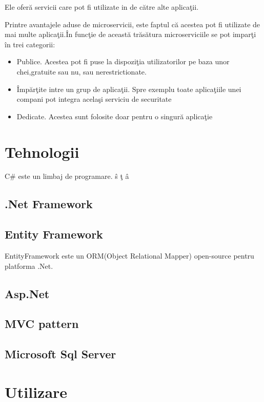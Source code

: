 \documentclass[a4paper,12pt]{report}
\begin{document}
 Ele ofer\u a servicii care pot fi utilizate in de c\u atre alte aplica\c tii.
\iffalse Utilizarea unui microserviciu se
 poate asem\u ana cu o clas\u a, apelarea metodelor fiind similara cu trimiterea unei
 cereri c\u atre server.Probabil cea mai mare deosebire intre acestea const\u a in faptul
 c\u a Microserviciile sunt  
\fi
Printre avantajele aduse de microservicii, este faptul c\u a acestea pot fi utilizate de
mai multe aplica\c tii.\^In func\c tie de aceast\u a tr\u as\u atura microserviciile se pot impar\c ti \^in 
trei categorii:
\begin{itemize}
    \item Publice.
    Acestea pot fi puse la dispozi\c tia utilizatorilor pe baza unor chei,gratuite sau nu,
    sau nerestrictionate.
    \item \^Imp\u ar\c tite intre un grup de aplica\c tii.
    Spre exemplu toate aplica\c tiile unei compani pot integra acela\c si serviciu de securitate
    \item Dedicate.
    Acestea sunt folosite doar pentru o singur\u a aplica\c tie 
\end{itemize} 




\chapter{Tehnologii}

    C\# este un limbaj de programare. \^ s \c t \^a

    \section{.Net Framework}
    \section{Entity Framework}
        EntityFramework este un ORM(Object Relational Mapper) open-source pentru platforma .Net.
    \section{Asp.Net}
    \section{MVC pattern}
    \section{Microsoft Sql Server}
    
\chapter{Utilizare}
\end{document}
